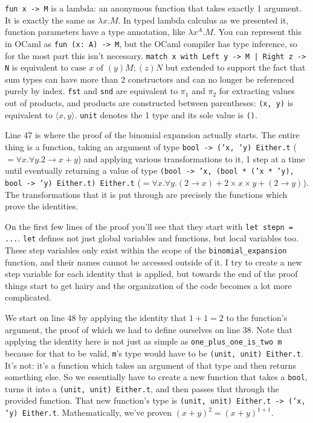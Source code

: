 \documentclass[12pt]{article}
\begin{document}
\texttt{fun x -> M} is a lambda: an anonymous function that takes exactly 1 argument. It is exactly the same as $\lambda x. M$. In typed lambda calculus as we presented it, function parameters have a type annotation, like $\lambda x^A. M$. You can represent this in OCaml as \texttt{fun (x: A) -> M}, but the OCaml compiler has type inference, so for the most part this isn't necessary. \texttt{match x with Left y -> M | Right z -> N} is equivalent to $\text{case } x \text{ of } (y)M; (z) N$ but extended to support the fact that sum types can have more than 2 constructors and can no longer be referenced purely by index. \texttt{fst} and \texttt{snd} are equivalent to $\pi_1$ and $\pi_2$ for extracting values out of products, and products are constructed between parentheses: \texttt{(x, y)} is equivalent to $\langle x, y \rangle$. \texttt{unit} denotes the 1 type and its sole value is \texttt{()}.

Line 47 is where the proof of the binomial expansion actually starts. The entire thing is a function, taking an argument of type \texttt{bool -> ('x, 'y) Either.t} ($= \forall x. \forall y. 2 \to x + y$) and applying various transformations to it, 1 step at a time until eventually returning a value of type \texttt{(bool -> 'x, (bool * ('x * 'y), bool -> 'y) Either.t) Either.t} ($= \forall x. \forall y. (2 \to x) + 2 \times x \times y + (2 \to y)$). The transformations that it is put through are precisely the functions which prove the identities.

On the first few lines of the proof you'll see that they start with \texttt{let stepn = ...}. \texttt{let} defines not just global variables and functions, but local variables too. These step variables only exist within the scope of the \texttt{binomial\_expansion} function, and their names cannot be accessed outside of it. I try to create a new step variable for each identity that is applied, but towards the end of the proof things start to get hairy and the organization of the code becomes a lot more complicated.

We start on line 48 by applying the identity that $1 + 1 = 2$ to the function's argument, the proof of which we had to define ourselves on line 38. Note that applying the identity here is not just as simple as \texttt{one\_plus\_one\_is\_two m} because for that to be valid, \texttt{m}'s type would have to be \texttt{(unit, unit) Either.t}. It's not: it's a function which takes an argument of that type and then returns something else. So we essentially have to create a new function that takes a \texttt{bool}, turns it into a \texttt{(unit, unit) Either.t}, and then passes that through the provided function. That new function's type is \texttt{(unit, unit) Either.t -> ('x, 'y) Either.t}. Mathematically, we've proven $(x + y)^2 = (x+y)^{1+1}$.
\end{document}
